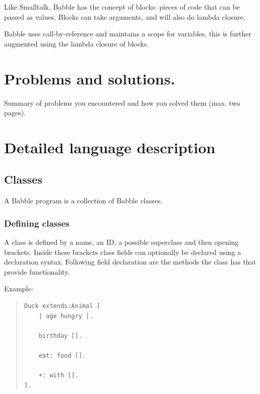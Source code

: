\documentclass[a4paper]{article}
\begin{document}
Like Smalltalk, Babble has the concept of blocks: pieces of code that can be passed as values.
Blocks can take arguments, and will also do lambda closure.

Babble uses call-by-reference and maintains a scope for variables, this is further augmented using the lambda closure of blocks.

\section{Problems and solutions.}
Summary of problems you encountered and how you solved them (max. two
pages).

\section{Detailed language description}

\subsection{Classes}
A Babble program is a collection of Babble classes.

\subsubsection{Defining classes}
A class is defined by a name, an ID, a possible superclass and then opening brackets. Inside these brackets class fields can optionally be declared using a declaration syntax. Following field declaration are the methods the class has that provide functionality.

Example:
\begin{quote}
\begin{lstlisting}
Duck extends:Animal [
	| age hungry |.
	
	birthday [].
	
	eat: food [].
	
	+: with [].
].
\end{lstlisting}
\end{quote}
\end{document}
